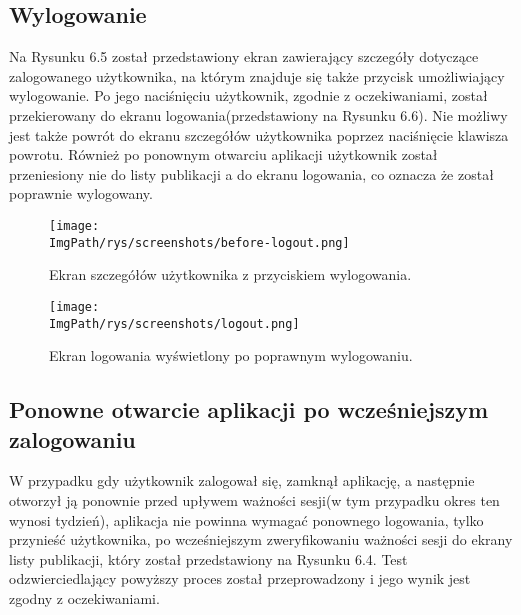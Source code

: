 \documentclass[a4paper,12pt,twoside,openany]{report}
\newcommand{\ImgPath}{.}
\begin{document}
\subsection{Wylogowanie}
Na Rysunku 6.5 został przedstawiony ekran zawierający szczegóły dotyczące zalogowanego użytkownika, na którym znajduje się także przycisk umożliwiający wylogowanie. Po jego naciśnięciu użytkownik, zgodnie z oczekiwaniami, został przekierowany do ekranu logowania(przedstawiony na Rysunku 6.6). Nie możliwy jest także powrót do ekranu szczegółów użytkownika poprzez naciśnięcie klawisza powrotu. Również po ponownym otwarciu aplikacji użytkownik został przeniesiony nie do listy publikacji a do ekranu logowania, co oznacza że został poprawnie wylogowany.


\begin{figure}[!htbp]
	\begin{center}
		\centering
		\texttt{[image: \\ImgPath/rys/screenshots/before-logout.png]}
	\end{center}
	\caption{Ekran szczegółów użytkownika z przyciskiem wylogowania.}
	\label{zrzutLogowanieEkranUserDetails}
\end{figure}


\pagebreak


\begin{figure}[!htbp]
	\begin{center}
		\centering
		\texttt{[image: \\ImgPath/rys/screenshots/logout.png]}
	\end{center}
	\caption{Ekran logowania wyświetlony po poprawnym wylogowaniu.}
	\label{zrzutLogowaniePoWylogowaniu}
\end{figure}

\subsection{Ponowne otwarcie aplikacji po wcześniejszym zalogowaniu}
W przypadku gdy użytkownik zalogował się, zamknął aplikację, a następnie otworzył ją ponownie przed upływem ważności sesji(w tym przypadku okres ten wynosi tydzień), aplikacja nie powinna wymagać ponownego logowania, tylko przynieść użytkownika, po wcześniejszym zweryfikowaniu ważności sesji do ekrany listy publikacji, który został przedstawiony na Rysunku 6.4. Test odzwierciedlający powyższy proces został przeprowadzony i jego wynik jest zgodny z oczekiwaniami.
\end{document}

